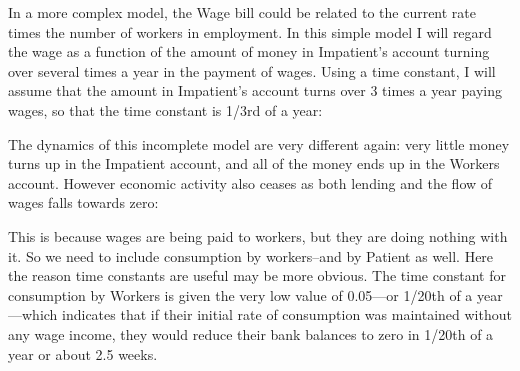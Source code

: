 In a more complex model, the Wage bill could be related to the current
rate times the number of workers in employment. In this simple model I
will regard the wage as a function of the amount of money in
Impatient's account turning over several times a year in the payment
of wages. Using a time constant, I will assume that the amount in
Impatient's account turns over 3 times a year paying wages, so that
the time constant is 1/3rd of a year:


The dynamics of this incomplete model are very different again: very
little money turns up in the Impatient account, and all of the money
ends up in the Workers account. However economic activity also ceases
as both lending and the flow of wages falls towards zero:


This is because wages are being paid to workers, but they are doing
nothing with it. So we need to include consumption by workers--and by
Patient as well. Here the reason time constants are useful may be more
obvious. The time constant for consumption by Workers is given the
very low value of 0.05---or 1/20th of a year---which indicates that if
their initial rate of consumption was maintained without any wage
income, they would reduce their bank balances to zero in 1/20th of a
year or about 2.5 weeks.
